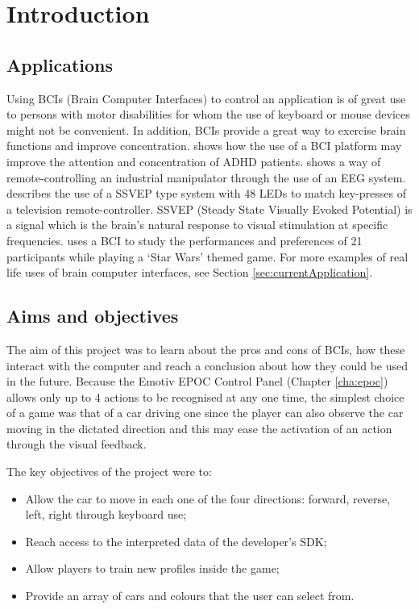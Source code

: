 \chapter{Introduction}
\label{cha:intro}

\section{Applications}

Using BCIs (Brain Computer Interfaces) to control an application is of great use to persons with motor disabilities for whom the use of keyboard or mouse devices might not be convenient. In addition,  BCIs provide a great way to exercise brain functions and improve concentration. \cite{adhd} shows how the use of a BCI platform may improve the attention and concentration of ADHD patients. \cite{manipulator} shows a way of remote-controlling an industrial manipulator through the use of an EEG system. \cite{remotecontroller} describes the use of a SSVEP type system with 48 LEDs to match key-presses of a television remote-controller. SSVEP (Steady State Visually Evoked Potential) is a signal which is the brain's natural response to visual stimulation at specific frequencies. \cite{exhibition} uses a BCI to study the performances and preferences of 21 participants while playing a `Star Wars' themed game. For more examples of real life uses of brain computer interfaces, see Section \ref{sec:currentApplication}.

\section{Aims and objectives}

The aim of this project was to learn about the pros and cons of BCIs, how these interact with the computer and reach a conclusion about how they could be used in the future. Because the Emotiv EPOC Control Panel (Chapter \ref{cha:epoc}) allows only up to 4 actions to be recognised at any one time, the simplest choice of a game was that of a car driving one since the player can also observe the car moving in the dictated direction and this may ease the activation of an action through the visual feedback.

The key objectives of the project were to:
\begin{itemize}
	\item Allow the car to move in each one of the four directions: forward, reverse, left, right through keyboard use; 
	\item Reach access to the interpreted data of the developer's SDK;
	\item Allow players to train new profiles inside the game;
	\item Provide an array of cars and colours that the user can select from.
\end{itemize}

